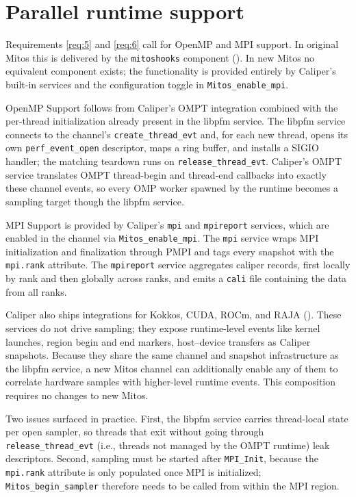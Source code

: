 \section{Parallel runtime support}\label{sec:parallel-runtime}

Requirements \ref{req:5} and \ref{req:6} call for OpenMP and MPI support. In original Mitos this is delivered by the \texttt{mitoshooks} component (). In new Mitos no equivalent component exists; the functionality is provided entirely by Caliper's built-in services and the configuration toggle in \texttt{Mitos\_enable\_mpi}.

OpenMP Support follows from Caliper's OMPT integration combined with the per-thread initialization already present in the libpfm service. The libpfm service connects to the channel's \texttt{create\_thread\_evt} and, for each new thread, opens its own \texttt{perf\_event\_open} descriptor, maps a ring buffer, and installs a SIGIO handler; the matching teardown runs on \texttt{release\_thread\_evt}. Caliper's OMPT service translates OMPT thread-begin and thread-end callbacks into exactly these channel events, so every OMP worker spawned by the runtime becomes a sampling target though the libpfm service.

MPI Support is provided by Caliper's \texttt{mpi} and \texttt{mpireport} services, which are enabled in the channel via \texttt{Mitos\_enable\_mpi}. The \texttt{mpi} service wraps MPI initialization and finalization through PMPI and tags every snapshot with the \texttt{mpi.rank} attribute. The \texttt{mpireport} service aggregates caliper records, first locally by rank and then globally across ranks, and emits a \texttt{cali} file containing the data from all ranks.

Caliper also ships integrations for Kokkos, CUDA, ROCm, and RAJA (). These services do not drive sampling; they expose runtime-level events like kernel launches, region begin and end markers, host--device transfers as Caliper snapshots. Because they share the same channel and snapshot infrastructure as the libpfm service, a new Mitos channel can additionally enable any of them to correlate hardware samples with higher-level runtime events. This composition requires no changes to new Mitos.

Two issues surfaced in practice. First, the libpfm service carries thread-local state per open sampler, so threads that exit without going through \texttt{release\_thread\_evt} (i.e., threads not managed by the OMPT runtime) leak descriptors. Second, sampling must be started after \texttt{MPI\_Init}, because the \texttt{mpi.rank} attribute is only populated once MPI is initialized; \texttt{Mitos\_begin\_sampler} therefore needs to be called from within the MPI region.

